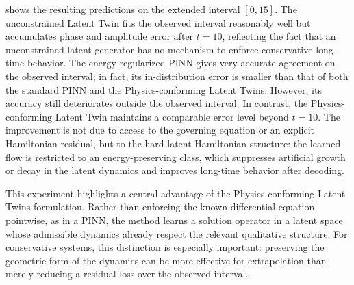 \documentclass[a4paper,fleqn]{cas-sc}
\theoremstyle{thmstyleone}%
\theoremstyle{thmstyletwo}%
\theoremstyle{thmstylethree}%
\begin{document}
 shows the resulting predictions on the extended interval $[0,15]$. The unconstrained Latent Twin fits the observed interval reasonably well but accumulates phase and amplitude error after $t=10$, reflecting the fact that an unconstrained latent generator has no mechanism to enforce conservative long-time behavior. The energy-regularized PINN gives very accurate agreement on the observed interval; in fact, its in-distribution error is smaller than that of both the standard PINN and the Physics-conforming Latent Twins. However, its accuracy still deteriorates outside the observed interval. In contrast, the Physics-conforming Latent Twin maintains a comparable error level beyond $t=10$. The improvement is not due to access to the governing equation or an explicit Hamiltonian residual, but to the hard latent Hamiltonian structure: the learned flow is restricted to an energy-preserving class, which suppresses artificial growth or decay in the latent dynamics and improves long-time behavior after decoding.

This experiment highlights a central advantage of the Physics-conforming Latent Twins formulation. Rather than enforcing the known differential equation pointwise, as in a PINN, the method learns a solution operator in a latent space whose admissible dynamics already respect the relevant qualitative structure. For conservative systems, this distinction is especially important: preserving the geometric form of the dynamics can be more effective for extrapolation than merely reducing a residual loss over the observed interval.
\end{document}
